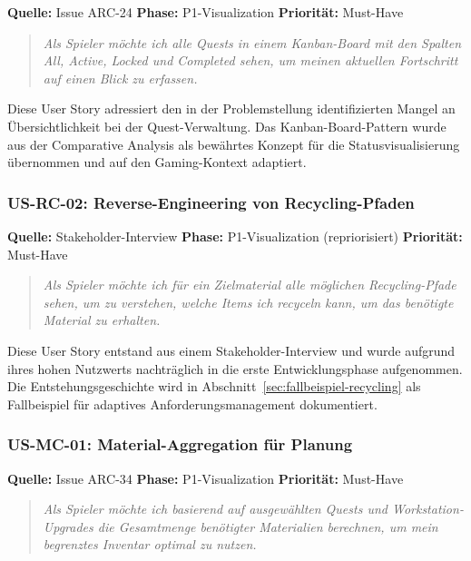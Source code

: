 \textbf{Quelle:} Issue ARC-24 \quad \textbf{Phase:} P1-Visualization \quad \textbf{Priorität:} Must-Have

\begin{quote}
\textit{\glqq Als Spieler möchte ich alle Quests in einem Kanban-Board mit den Spalten \glqq All\grqq{}, \glqq Active\grqq{}, \glqq Locked\grqq{} und \glqq Completed\grqq{} sehen, um meinen aktuellen Fortschritt auf einen Blick zu erfassen.\grqq{}}
\end{quote}

Diese User Story adressiert den in der Problemstellung identifizierten Mangel an Übersichtlichkeit bei der Quest-Verwaltung. Das Kanban-Board-Pattern wurde aus der Comparative Analysis als bewährtes Konzept für die Statusvisualisierung übernommen und auf den Gaming-Kontext adaptiert.

\subsubsection{US-RC-02: Reverse-Engineering von Recycling-Pfaden}

\textbf{Quelle:} Stakeholder-Interview \quad \textbf{Phase:} P1-Visualization (repriorisiert) \quad \textbf{Priorität:} Must-Have

\begin{quote}
\textit{\glqq Als Spieler möchte ich für ein Zielmaterial alle möglichen Recycling-Pfade sehen, um zu verstehen, welche Items ich recyceln kann, um das benötigte Material zu erhalten.\grqq{}}
\end{quote}

Diese User Story entstand aus einem Stakeholder-Interview und wurde aufgrund ihres hohen Nutzwerts nachträglich in die erste Entwicklungsphase aufgenommen. Die Entstehungsgeschichte wird in Abschnitt~\ref{sec:fallbeispiel-recycling} als Fallbeispiel für adaptives Anforderungsmanagement dokumentiert.

\subsubsection{US-MC-01: Material-Aggregation für Planung}

\textbf{Quelle:} Issue ARC-34 \quad \textbf{Phase:} P1-Visualization \quad \textbf{Priorität:} Must-Have

\begin{quote}
\textit{\glqq Als Spieler möchte ich basierend auf ausgewählten Quests und Workstation-Upgrades die Gesamtmenge benötigter Materialien berechnen, um mein begrenztes Inventar optimal zu nutzen.\grqq{}}
\end{quote}

